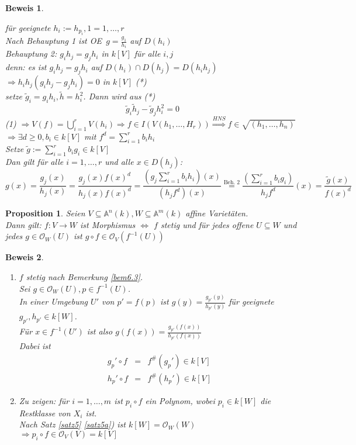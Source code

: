 \documentclass[a4paper,12pt]{report}
\theoremstyle{break}
\newtheorem{Prop}[Def]{Proposition}
\theoremstyle{nonumberbreak}
\newtheorem{Bew}{Beweis}
\theoremstyle{nonumberplain}
\newcommand{\quot}[1]{\textrm{\glqq}{#1}\textrm{\grqq}}
\newenvironment{twosidedproof}{\begin{enumerate}[\quot{$\Rightarrow$}:]}{\end{enumerate}}
\newcommand{\proofforward}{\item[\quot{$\Rightarrow$}:]}
\newcommand{\proofreverse}{\item[\quot{$\Leftarrow$}:]}
\newcommand{\A}{\mathbb{A}}
\renewcommand{\OE}{O\!\!E~}
\begin{document}
\begin{Bew}
\begin{enumerate}[a)]
\begin{description}
	f\"ur geeignete $h_i:=h_{p_i}, 1= 1,\dots ,r$\\
	Nach Behauptung 1 ist \OE $ g= \frac{g_1}{h_i}$ auf $D(h_i)$\\
	\emph{Behauptung 2:} $g_i h_j = g_j h_i$ in $k[V]$ f\"ur alle $i,j$\\
	\emph{denn:} es ist $g_ih_j = g_jh_i$ auf $D(h_i)\cap D(h_j)=D(h_ih_j)$\\
	$\Rightarrow h_ih_j(g_ih_j-g_jh_i)=0$ in $k[V]$ (*)\\
	setze $\tilde g_i = g_ih_i, \tilde h = h_i^2$. Dann wird aus (*)
		\[\tilde g_i \tilde h_j -\tilde g_j h_i^2 =0\]
	(1) $\Rightarrow V(f) =\bigcup_{i=1}^r V(h_i) \Rightarrow f \in I(V(h_1,\dots ,H_r)) \stackrel{HNS}{\Rightarrow } f\in \sqrt{(h_1,\dots ,h_n)}$\\
	$\Rightarrow \exists d\geq 0, b_i\in k[V]$ mit $f^d=\sum_{i=1}^rb_ih_i$\\
	Setze $\tilde g := \sum_{i=1}^rb_ig_i\in k[V]$\\
	Dan gilt f\"ur alle $i=1,\dots ,r$ und alle $x\in D(h_j)$:
		\[g(x)=\frac{g_j(x)}{h_j(x)}=\frac{g_j(x)f(x)^d}{h_j(x)f(x)^d}=\frac{(g_j\sum_{i=1}^rb_ih_i)(x)}{(h_jf^d)(x)} \stackrel{\textrm{Beh. 2}}{=} \frac{(\sum_{i=1}^rb_ig_i)}{h_jf^d}(x) = \frac{\tilde g(x)}{f(x)^d}\]
\end{description}
\end{enumerate}\end{Bew}

\begin{Prop}
Seien $V\subseteq\A^n(k), W\subseteq \A^m(k)$ affine Variet\"aten.\\
Dann gilt: $f:V\to W$ ist Morphismus $\Leftrightarrow$ $f$ stetig und f\"ur jedes offene $U\subseteq W$ und jedes $g\in \mathcal O_W(U)$ ist $g\circ f\in \mathcal O_V(f^{-1}(U))$
\end{Prop}

\begin{Bew}\begin{twosidedproof}
\proofforward
$f$ stetig nach Bemerkung \ref{bem6.3}.\\
Sei $g\in \mathcal O_W(U), p \in f^{-1}(U)$.\\
In einer Umgebung $U'$ von $p'=f(p)$ ist $g(y)=\frac{g_{p'}(y)}{h_{p'}(y)}$ f\"ur geeignete $g_{p'}, h_{p'}\in k[W]$.\\
F\"ur $x\in f^{-1}(U')$ ist also $g(f(x))=\frac{g_{p'}(f(x))}{h_{p'}(f(x))}$\\
Dabei ist\[\begin{array}{lcr}
	g_p'\circ f & = & f^{\#}(g_p')\in k[V]\\
	h_p'\circ f & = & f^{\#}(h_p')\in k[V]\end{array}\]

\proofreverse
Zu zeigen: f\"ur $i=1,\dots ,m$ ist $p_i\circ f$ ein Polynom, wobei $p_i\in k[W]$ die Restklasse von $X_i$ ist.\\
Nach Satz \ref{satz5} \ref{satz5a}) ist $k[W] = \mathcal O_W(W)$\\
$\Rightarrow p_i\circ f\in \mathcal O_V(V)=k[V]$
\end{twosidedproof}\end{Bew}
\end{document}
